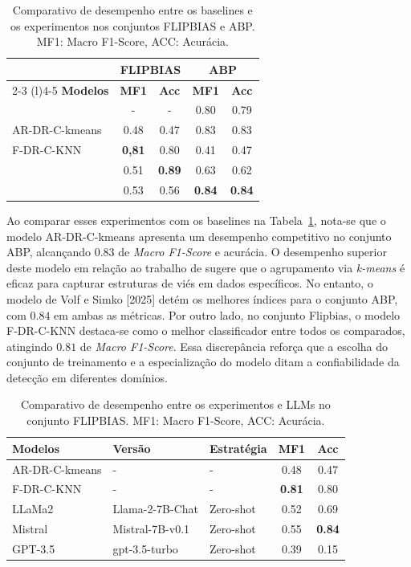 \begin{table}[ht]
\centering
\caption{Comparativo de desempenho entre os baselines e os experimentos nos conjuntos FLIPBIAS e ABP. MF1: Macro F1-Score, ACC: Acurácia.}
\label{tab:modelos-ia}
\begin{tabular}{@{}lcccc@{}}
\toprule
 & \multicolumn{2}{c}{\textbf{FLIPBIAS}} & \multicolumn{2}{c}{\textbf{ABP}} \\ \cmidrule(lr){2-3} \cmidrule(l){4-5} 
\textbf{Modelos} & \textbf{MF1} & \textbf{Acc} & \textbf{MF1} & \textbf{Acc} \\ \midrule
\cite{baly2020we} & - & - & 0.80 & 0.79 \\
AR-DR-C-kmeans & 0.48 & 0.47 & 0.83 & 0.83 \\
F-DR-C-KNN & \textbf{0,81} & 0.80 & 0.41 & 0.47 \\
\cite{lin-etal-2025-investigating} & 0.51 & \textbf{0.89} & 0.63 & 0.62 \\ 
\cite{volf2025political} & 0.53 & 0.56 & \textbf{0.84} & \textbf{0.84} \\ \bottomrule
\end{tabular}
\end{table}

Ao comparar esses experimentos com os baselines na Tabela~\ref{tab:modelos-ia}, nota-se que o modelo AR-DR-C-kmeans apresenta um desempenho competitivo no conjunto ABP, 
alcançando $0.83$ de \textit{Macro F1-Score} e acurácia. O desempenho superior deste modelo em relação ao trabalho de \cite{baly2020we} sugere que o agrupamento via \textit{k-means} 
é eficaz para capturar estruturas de viés em dados específicos. No entanto, o modelo de Volf e Simko [2025] detém os melhores índices para o conjunto ABP, com $0.84$ em ambas as métricas. 
Por outro lado, no conjunto Flipbias, o modelo F-DR-C-KNN destaca-se como o melhor classificador entre todos os comparados, atingindo $0.81$ de \textit{Macro F1-Score}. 
Essa discrepância reforça que a escolha do conjunto de treinamento e a especialização do modelo ditam a confiabilidade da detecção em diferentes domínios.

\begin{table}[ht]
\centering
\caption{Comparativo de desempenho entre os experimentos e LLMs no conjunto FLIPBIAS. MF1: Macro F1-Score, ACC: Acurácia.}
\label{tab:comparativo-llms}
\begin{tabular}{@{}lllcc@{}}
\toprule
\textbf{Modelos} & \textbf{Versão} & \textbf{Estratégia} & \textbf{MF1} & \textbf{Acc} \\ \midrule
AR-DR-C-kmeans & - & - & 0.48 & 0.47 \\
F-DR-C-KNN & - & - & \textbf{0.81} & 0.80 \\
LLaMa2 & Llama-2-7B-Chat & Zero-shot & 0.52 & 0.69 \\
Mistral & Mistral-7B-v0.1 & Zero-shot & 0.55 & \textbf{0.84} \\
GPT-3.5 & gpt-3.5-turbo & Zero-shot & 0.39 & 0.15 \\ \bottomrule
\end{tabular}
\end{table}

